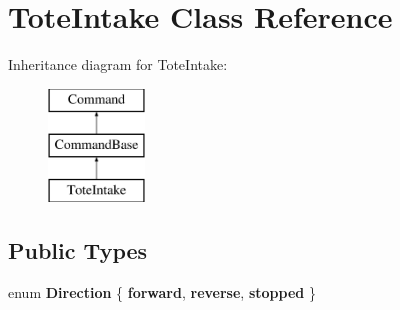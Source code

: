 \hypertarget{class_tote_intake}{}\section{Tote\+Intake Class Reference}
\label{class_tote_intake}
Inheritance diagram for Tote\+Intake\+:\begin{figure}[H]
\begin{center}
\leavevmode
\includegraphics[height=3.000000cm]{class_tote_intake}
\end{center}
\end{figure}
\subsection*{Public Types}
\begin{DoxyCompactItemize}
\item 
\hypertarget{class_tote_intake_a526041a98825e90d7d0db04bf2ad3154}{}enum {\bfseries Direction} \{ {\bfseries forward}, 
{\bfseries reverse}, 
{\bfseries stopped}
 \}\label{class_tote_intake_a526041a98825e90d7d0db04bf2ad3154}

\end{DoxyCompactItemize}
